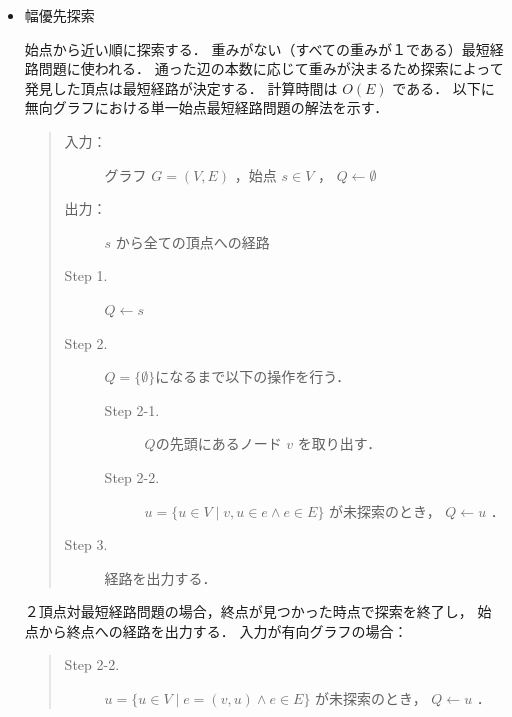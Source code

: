 \documentclass[12pt]{optlab-bachelor}
\begin{document}
\begin{itemize}
  \item 幅優先探索

  始点から近い順に探索する．
  重みがない（すべての重みが１である）最短経路問題に使われる．
  通った辺の本数に応じて重みが決まるため探索によって発見した頂点は最短経路が決定する．
  計算時間は $O(E)$ である．
  以下に無向グラフにおける単一始点最短経路問題の解法を示す．

  \begin{quote}
    \begin{description}
      \item[入力：] グラフ $G=(V,E)$ ，始点 $s \in V$ ， $Q \leftarrow \emptyset$
      \item[出力：] $s$ から全ての頂点への経路
      \item[Step 1.] $Q \leftarrow s$
      \item[Step 2.] $Q = \{\emptyset\}$になるまで以下の操作を行う．
      \begin{description}
        \item[Step 2-1.] $Q$の先頭にあるノード $v$ を取り出す．
        \item[Step 2-2.] $u = \{u \in V \mid v,u \in e \land e \in E\}$ が未探索のとき，
        $Q \leftarrow u$ ．
      \end{description}

      \item[Step 3.] 経路を出力する．
    \end{description}
  \end{quote}
  ２頂点対最短経路問題の場合，終点が見つかった時点で探索を終了し，
  始点から終点への経路を出力する．
  入力が有向グラフの場合：
  \begin{quote}
    \begin{description}
      \item[Step 2-2.]  $u = \{u \in V \mid e = (v,u) \land e \in E\}$ が未探索のとき，
      $Q \leftarrow u$ ．
    \end{description}
  \end{quote}
\end{itemize}
\end{document}

